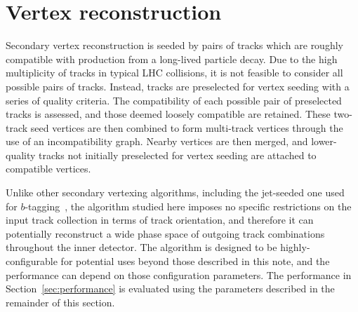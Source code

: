 \documentclass[PUB,UKenglish, texlive=2018]{\ATLASLATEXPATH atlasdoc}
\begin{document}
\section{Vertex reconstruction}

Secondary vertex reconstruction is seeded by pairs of tracks which are roughly compatible with production from a long-lived particle decay.  
Due to the high multiplicity of tracks in typical LHC collisions, it is not feasible to consider all possible pairs of tracks.  
Instead, tracks are preselected for vertex seeding with a series of quality criteria.  
The compatibility of each possible pair of preselected tracks is assessed, and those deemed loosely compatible are retained.  
These two-track seed vertices are then combined to form multi-track vertices through the use of an incompatibility graph.  
Nearby vertices are then merged, and lower-quality tracks not initially preselected for vertex seeding are attached to compatible vertices. 

Unlike other secondary vertexing algorithms, including the jet-seeded one used for $b$-tagging~\cite{Aad:2015ydr,ATL-PHYS-PUB-2017-011}, 
the algorithm studied here imposes no specific restrictions on the input track collection in terms of track orientation, 
and therefore it can potentially reconstruct a wide phase space of outgoing track combinations throughout the inner detector.
The algorithm is designed to be highly-configurable for potential uses beyond those described in this note, and the performance can depend on those configuration parameters. 
The performance in Section~\ref{sec:performance} is evaluated using the parameters described in the remainder of this section.

\end{document}
